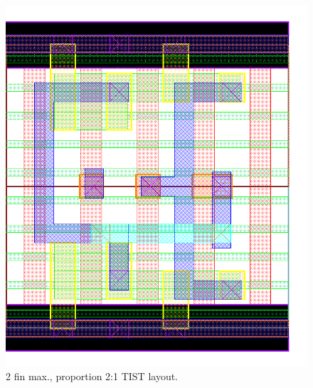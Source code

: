 \documentclass[pgmicro,mestrado,english]{iiufrgs}
\begin{document}
\begin{figure}[H]
\centering
\includegraphics[width=\textwidth,height=\textheight,keepaspectratio]{TIST2F1F.png}
\caption{2 fin max., proportion 2:1 TIST layout.}
\label{fig:TIST1F}
\end{figure}
\end{document}
